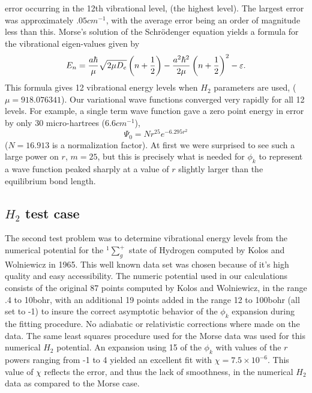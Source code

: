 \documentclass[12pt,thmsa]{article}
\begin{document}
error occurring in the 12th vibrational level, (the highest level). The
largest error was approximately $.05cm^{-1}$, with the average error being
an order of magnitude less than this. Morse's solution of the
Schr\"{o}denger equation yields a formula for the vibrational eigen-values
given by 
\begin{equation}
E_n=\frac{a\hbar }\mu \sqrt{2\mu D_e}\left( n+\frac 12\right) -\frac{%
a^2\hbar ^2}{2\mu }\left( n+\frac 12\right) ^2-\varepsilon .
\end{equation}
This formula gives 12 vibrational energy levels when $H_2$ parameters are
used, ($\mu =918.076341$). Our variational wave functions converged very
rapidly for all 12 levels. For example, a single term wave function gave a
zero point energy in error by only 30 micro-hartrees (6.6$cm^{-1}$), 
\begin{equation}
\Psi _0=Nr^{25}e^{-6.295r^2}
\end{equation}
($N=16.913$ is a normalization factor). At first we were surprised to see
such a large power on $r$, $m=25$, but this is precisely what is needed for $%
\phi _k$ to represent a wave function peaked sharply at a value of $r$
slightly larger than the equilibrium bond length.

\subsection{$H_2$ test case}

The second test problem was to determine vibrational energy levels from the
numerical potential for the $^1\sum_g^{+}$ state of Hydrogen computed by
Kolos and Wolniewicz in 1965\cite{Kolos65}. This well known data set was
chosen because of it's high quality and easy accessibility. The numeric
potential used in our calculations consists of the original 87 points
computed by Kolos and Wolniewicz, in the range .4 to 10bohr, with an
additional 19 points added in the range 12 to 100bohr (all set to -1) to
insure the correct asymptotic behavior of the $\phi _k$ expansion during the
fitting procedure. No adiabatic or relativistic corrections where made on
the data. The same least squares procedure used for the Morse data was used
for this numerical $H_2$ potential. An expansion using 15 of the $\phi _k$
with values of the $r$ powers ranging from -1 to 4 yielded an excellent fit
with $\chi =7.5\times 10^{-6}.$ This value of $\chi $ reflects the error,
and thus the lack of smoothness, in the numerical $H_2$ data as compared to
the Morse case.
\end{document}
